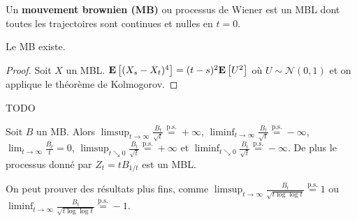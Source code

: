 	\begin{defn}
		Un \textbf{mouvement brownien (MB)} ou processus de Wiener est un MBL dont toutes les trajectoires sont continues et nulles en $t = 0$.
	\end{defn}
	
	\begin{pop}
		Le MB existe.
	\end{pop}
	
	\begin{proof}
		Soit $X$ un MBL.
		$\mathbf{E} \left[ (X_s - X_t)^4 \right] = (t - s)^2 \mathbf{E} \left[ U^2 \right]$ où $U \sim \mathcal{N}(0,1)$ et on applique le théorème de Kolmogorov.
	\end{proof}
	
	TODO\\
	
	\begin{pop}
		Soit $B$ un MB.
		Alors $\limsup_{t \to \infty} \frac{B_t}{\sqrt{t}} \overset{\text{p.s.}}{=} +\infty$, $\liminf_{t \to \infty} \frac{B_t}{\sqrt{t}} \overset{\text{p.s.}}{=} -\infty$, $\lim_{t \to \infty} \frac{B_t}{t} = 0$, $\limsup_{t \searrow 0} \frac{B_t}{\sqrt{t}} \overset{\text{p.s.}}{=} +\infty$ et $\liminf_{t \searrow 0} \frac{B_t}{\sqrt{t}} \overset{\text{p.s.}}{=} -\infty$.
		De plus le processus donné par $Z_t = t B_{1/t}$ est un MBL.
	\end{pop}
	
	\begin{rem}
		On peut prouver des résultats plus fins, comme $\limsup_{t \to \infty} \frac{B_t}{\sqrt{t \log \log t}} \overset{\text{p.s.}}{=} 1$ ou $\liminf_{t \to \infty} \frac{B_t}{\sqrt{t \log \log t}} \overset{\text{p.s.}}{=} -1$.
	\end{rem}
	
